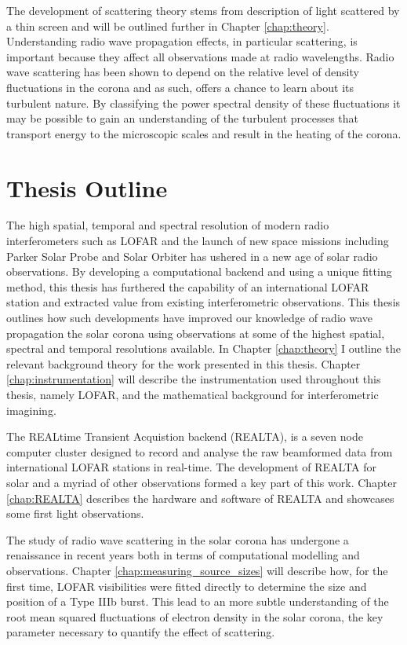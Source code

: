The development of scattering theory stems from \cite{Chandrasekhar1952} description of light scattered by a thin screen and will be outlined further in Chapter \ref{chap:theory}. Understanding radio wave propagation effects, in particular scattering, is important because they affect all observations made at radio wavelengths. Radio wave scattering has been shown to depend on the relative level of density fluctuations in the corona and as such, offers a chance to learn about its turbulent nature. By classifying the power spectral density of these fluctuations it may be possible to gain an understanding of the turbulent processes that transport energy to the microscopic scales and result in the heating of the corona. 


\section{Thesis Outline}
The high spatial, temporal and spectral resolution of modern radio interferometers such as LOFAR and the launch of new space missions including Parker Solar Probe \citep[PSP;][]{Fox2016} and Solar Orbiter \citep{Muller2020} has ushered in a new age of solar radio observations. By developing a computational backend and using a unique fitting method, this thesis has furthered the capability of an international LOFAR station and extracted value from existing interferometric observations. This thesis outlines how such developments have improved our knowledge of radio wave propagation the solar corona using observations at some of the highest spatial, spectral and temporal resolutions available. In Chapter \ref{chap:theory} I outline the relevant background theory for the work presented in this thesis. Chapter \ref{chap:instrumentation} will describe the instrumentation used throughout this thesis, namely LOFAR, and the mathematical background for interferometric imagining. 

The REALtime Transient Acquistion backend (REALTA), is a seven node computer cluster designed to record and analyse the raw beamformed data from international LOFAR stations in real-time. The development of REALTA for solar and a myriad of other observations formed a key part of this work. Chapter \ref{chap:REALTA} describes the hardware and software of REALTA and showcases some first light observations.
 
The study of radio wave scattering in the solar corona has undergone a renaissance in recent years both in terms of computational modelling and observations. Chapter \ref{chap:measuring_source_sizes} will describe how, for the first time, LOFAR visibilities were fitted directly to determine the size and position of a Type IIIb burst. This lead to an more subtle understanding of the root mean squared fluctuations of electron density in the solar corona, the key parameter necessary to quantify the effect of scattering. 

